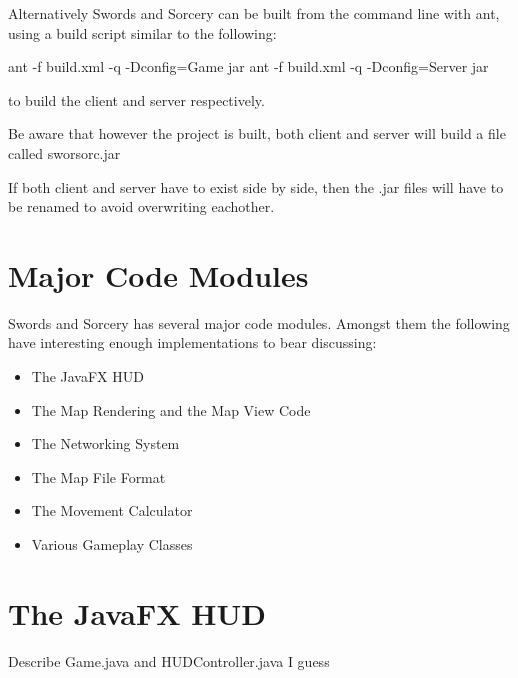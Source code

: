\documentclass[12pt,a4paper]{article}
\begin{document}
Alternatively Swords and Sorcery can be built from the command line with ant,
using a build script similar to the following:

    ant -f build.xml -q -Dconfig=Game jar
    ant -f build.xml -q -Dconfig=Server jar

to build the client and server respectively.

Be aware that however the project is built, 
both client and server will build a file called sworsorc.jar

If both client and server have to exist side by side,
then the .jar files will have to be renamed to avoid overwriting eachother.

\section{Major Code Modules}
Swords and Sorcery has several major code modules. Amongst them the following
have interesting enough implementations to bear discussing:

\begin{itemize}
	\item The JavaFX HUD	
	\item The Map Rendering and the Map View Code
	\item The Networking System
	\item The Map File Format
	\item The Movement Calculator
    \item Various Gameplay Classes
\end{itemize}


\section{The JavaFX HUD}
Describe Game.java and HUDController.java I guess
\end{document}
